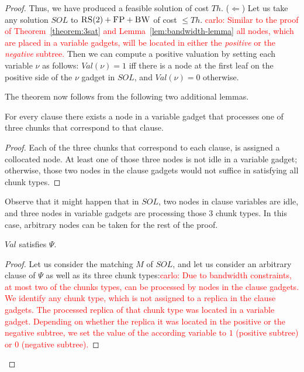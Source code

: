 \documentclass[9pt]{sigcomm-alternate}
\newcommand{\carlo}[1]{\textcolor{red}{carlo: #1}}
\newcommand{\variab}{\nu}
\newcommand{\FP}{\textsc{FP}}
\newcommand{\RS}{\textsc{RS}}
\newcommand{\BW}{\textsc{BW}}
\newcommand{\Formula}{\ensuremath{\Psi}}
\newcommand{\Thr}{\ensuremath{Th}}
\newcommand{\Val}{\ensuremath{Val}}
\newcommand{\Sol}{\ensuremath{SOL}}
\begin{document}
\begin{appendix}
\begin{proof}
Thus, we have produced a feasible solution of cost $\Thr$.
($\Leftarrow$)
Let us take any solution $\Sol$ to $\RS(2)+\FP+\BW$ of cost $\leq \Thr$. 
\carlo{Similar to the proof of 
Theorem~\ref{theorem:3sat} and Lemma~\ref{lem:bandwidth-lemma} all nodes, which 
are placed in a variable gadgets, will be located in either the \emph{positive} 
or the \emph{negative} subtree.} Then we can compute a positive valuation by 
setting each variable $\variab$
as follows:
$\Val(\variab)= 1$ iff there is a node at the first leaf on the positive side of the $\variab$ gadget in $\Sol$,
and $\Val(\variab)=0$ otherwise. 



The theorem now follows from the following two additional lemmas.
\begin{lemma}
For every clause there exists a node in a variable gadget that processes one of
  three chunks that correspond to that clause.
\end{lemma}
\begin{proof}
 Each of the three chunks that correspond to each clause,
 is assigned a collocated node.
 At least one of those three nodes is not idle in a variable gadget;
otherwise, those two nodes in the clause gadgets would not suffice in
satisfying all chunk types.
\end{proof}

Observe that it might happen that in $\Sol$, two nodes in
clause variables are idle, and three nodes in variable gadgets are
processing those $3$ chunk types. In this case,
arbitrary nodes can be taken for the rest
of the proof.

\begin{lemma}
$\Val$ satisfies $\Formula$.
\end{lemma}
\begin{proof}
Let us consider the matching $M$ of $\Sol$, and let us consider an arbitrary clause of
$\Formula$ as well as its three chunk types:\carlo{ Due to bandwidth 
constraints, at most two of the chunks types, can be processed by nodes in the 
clause gadgets. We identify any chunk type, which is not assigned to a replica 
in the clause gadgets. The processed replica of that chunk type was located in 
a variable gadget. Depending on whether the replica it was located in the 
positive or the negative subtree, we set the value of the according variable to 
$1$ (positive subtree) or $0$ (negative subtree).}
\end{proof}


\end{proof}
\end{appendix}
\end{document}
